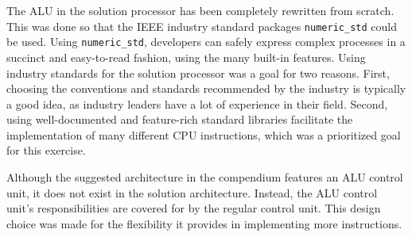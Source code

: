 The ALU in the solution processor has been completely rewritten from scratch.
This was done so that the IEEE industry standard packages \texttt{numeric\_std} could be used.
Using \texttt{numeric\_std}, developers can safely express complex processes in a succinct and easy-to-read fashion, using the many built-in features.
Using industry standards for the solution processor was a goal for two reasons.
First, choosing the conventions and standards recommended by the industry is typically a good idea, as industry leaders have a lot of experience in their field.
Second, using well-documented and feature-rich standard libraries facilitate the implementation of many different CPU instructions, which was a prioritized goal for this exercise.

Although the suggested architecture in the compendium features an ALU control unit\cite{compendium}, it does not exist in the solution architecture.
Instead, the ALU control unit's responsibilities are covered for by the regular control unit.
This design choice was made for the flexibility it provides in implementing more instructions.
